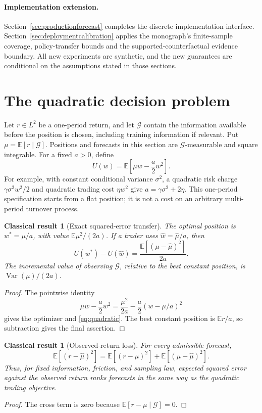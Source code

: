 \documentclass[11pt]{article}
\theoremstyle{plain}
\newtheorem{classical}[theorem]{Classical result}
\theoremstyle{definition}
\theoremstyle{remark}
\newcommand{\E}{\mathbb E}
\DeclareMathOperator{\Var}{Var}
\begin{document}
\paragraph{Implementation extension.}
Section~\ref{sec:productionforecast} completes the discrete implementation interface.
Section~\ref{sec:deploymentcalibration} applies the monograph's finite-sample coverage,
policy-transfer bounds and the supported-counterfactual evidence boundary.
All new experiments are synthetic, and the new guarantees are conditional
on the assumptions stated in those sections.

\section{The quadratic decision problem}

Let \(r\in L^2\) be a one-period return, and let \(\mathcal G\) contain
the information available before the position is chosen, including
training information if relevant. Put \(\mu=\E[r\mid\mathcal G]\).
Positions and forecasts in this section are \(\mathcal G\)-measurable
and square integrable. For a fixed \(a>0\), define
\[
U(w)=\E\left[\mu w-\frac a2w^2\right].
\]
For example, with constant conditional variance \(\sigma^2\), a
quadratic risk charge \(\gamma\sigma^2w^2/2\) and quadratic trading cost
\(\eta w^2\) give \(a=\gamma\sigma^2+2\eta\).
This one-period specification starts from a flat position; it is not
a cost on an arbitrary multi-period turnover process.

\begin{classical}[Exact squared-error transfer]\label{thm:quadratic}
The optimal position is \(w^\ast=\mu/a\), with value
\(\E\mu^2/(2a)\). If a trader uses \(\widehat w=\widehat\mu/a\), then
\begin{equation}\label{eq:quadratic}
U(w^\ast)-U(\widehat w)=\frac{\E[(\mu-\widehat\mu)^2]}{2a}.
\end{equation}
The incremental value of observing \(\mathcal G\), relative to the best
constant position, is \(\Var(\mu)/(2a)\).
\end{classical}
\begin{proof}
The pointwise identity
\[
\mu w-\frac a2w^2=\frac{\mu^2}{2a}-\frac a2(w-\mu/a)^2
\]
gives the optimizer and \eqref{eq:quadratic}. The best constant position
is \(\E r/a\), so subtraction gives the final assertion.
\end{proof}

\begin{classical}[Observed-return loss]\label{cor:observedmse}
For every admissible forecast,
\[
\E[(r-\widehat\mu)^2]=\E[(r-\mu)^2]+\E[(\mu-\widehat\mu)^2].
\]
Thus, for fixed information, friction, and sampling law, expected
squared error against the observed return ranks forecasts in the same
way as the quadratic trading objective.
\end{classical}
\begin{proof}
The cross term is zero because \(\E[r-\mu\mid\mathcal G]=0\).
\end{proof}
\end{document}
